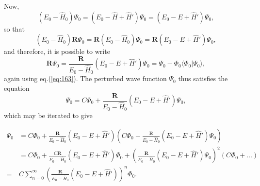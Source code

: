 Now,
\begin{equation}
\nonumber
(E_0 - \hat{H}_0) \Psi_0 = (E_0-\hat{H}+\hat{H}') \Psi_0 = (E_0-E+\hat{H}') \Psi_0,
\end{equation}
so that 
\begin{equation}
\nonumber
(E_0 - \hat{H}_0) \mathbf{R} \Psi_0 = \mathbf{R}(E_0-\hat{H}_0) \Psi_0 = \mathbf{R} (E_0-E+\hat{H}') \Psi_0,
\end{equation}
and therefore, it is possible to write~\cite{Raimes1972}
\begin{equation}
\nonumber
\mathbf{R} \Psi_0= \frac{\mathbf{R}}{E_0 - \hat{H}_0} (E_0 - E +\hat{H}') \Psi_0 = \Psi_0 - \Phi_0  \langle \Phi_0 | \Psi_0 \rangle,
\end{equation}
again using eq.(\ref{eq:163}). The perturbed wave function $\Psi_0$ thus satisfies the equation
\begin{equation}
\nonumber
\Psi_0= C \Phi_0 + \frac{\mathbf{R}}{E_0 - \hat{H}_0} (E_0 - E +\hat{H}') \Psi_0,
\end{equation}
which may be iterated to give

\begin{align}
\nonumber
\Psi_0 &= C \Phi_0 + \frac{\mathbf{R}}{E_0 - \hat{H}_0} (E_0 - E +\hat{H}') \left(  C \Phi_0 + \frac{\mathbf{R}}{E_0 - \hat{H}_0} (E_0 - E +\hat{H}') \Psi_0 \right) \\
 &= C \Phi_0 + \frac{C \mathbf{R}}{E_0 - \hat{H}_0} (E_0 - E +\hat{H}') \Phi_0 + \left(  \frac{\mathbf{R}}{E_0 - \hat{H}_0} (E_0 - E +\hat{H}') \Psi_0 \right)^2  (C \Phi_0 + \dots)\\ \nonumber
 =& C \sum_{n=0}^{\infty} \left(  \frac{\mathbf{R}}{E_0 - \hat{H}_0} (E_0 - E +\hat{H}') \right)^n \Phi_0.
\end{align}

